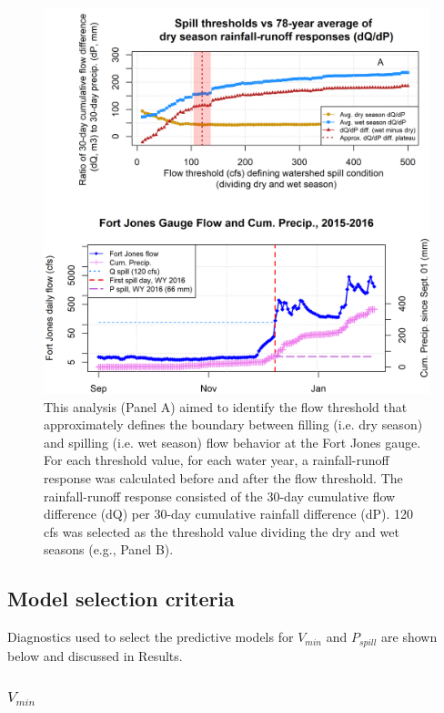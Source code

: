 \documentclass[hess, manuscript]{copernicus}
\begin{document}
\begin{figure}
\includegraphics[width=1\linewidth]{f10} \caption{\label{fig:qspill_figs} This analysis (Panel A) aimed to identify the flow threshold that approximately defines the boundary between filling (i.e. dry season) and spilling (i.e. wet season) flow behavior at the Fort Jones gauge. For each threshold value, for each water year, a rainfall-runoff response was calculated before and after the flow threshold. The rainfall-runoff response consisted of the 30-day cumulative flow difference (dQ) per 30-day cumulative rainfall difference (dP). 120 cfs was selected as the threshold value dividing the dry and wet seasons (e.g., Panel B).}\label{fig:qspill_figs}
\end{figure}

\newpage

\subsection{Model selection criteria}

Diagnostics used to select the predictive models for \(V_{min}\) and
\(P_{spill}\) are shown below and discussed in Results.

\subsubsection{\texorpdfstring{\(V_{min}\)}{V\_\{min\}}}
\end{document}
